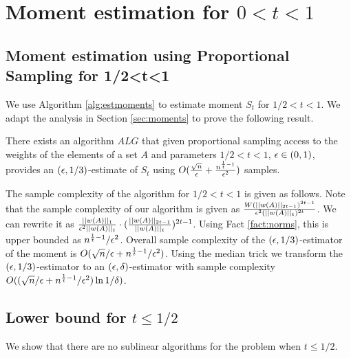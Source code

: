 \section{Moment estimation for $0<t<1$}\label{sec:small-t}

\subsection{Moment estimation using Proportional Sampling for 1/2<t<1} We use Algorithm \ref{alg:estmoments} to estimate moment $S_t$ for $1/2<t<1$. We adapt the analysis in Section \ref{sec:moments} to prove the following result.

\begin{thm} There exists an algorithm $ALG$ that given proportional sampling access to the weights of the elements of a set $A$ and parameters $1/2<t<1$, $\epsilon\in (0,1)$, provides an $(\epsilon,1/3)$-estimate of $S_t$ using $O(\frac{\sqrt{n}}{\epsilon}+\frac{n^{\frac{1}{t}-1}}{\epsilon^2})$ samples. \end{thm}

The sample complexity of the algorithm for $1/2<t<1$ is given as follows. Note that the sample complexity of our algorithm is given as $\frac{W (||w(A)||_{2t-1})^{2t-1}}{\epsilon^2 (||w(A)||_t)^{2t}}$. We can rewrite it as $\frac{||w(A)||_1}{\epsilon^2 ||w(A)||_t} \cdot (\frac{||w(A)||_{2t-1}}{||w(A)||_t})^{2t-1}$. Using Fact \ref{fact:norms}, this is upper bounded as $n^{\frac{1}{t}-1}/\epsilon^2$. Overall sample complexity of the $(\epsilon,1/3)$-estimator of the moment is $O(\sqrt{n}/\epsilon+ n^{\frac{1}{t}-1}/\epsilon^2)$. Using the median trick we transform the $(\epsilon,1/3)$-estimator to an $(\epsilon,\delta)$-estimator with sample complexity $O((\sqrt{n}/\epsilon+ n^{\frac{1}{t}-1}/\epsilon^2) \ln 1/\delta)$.


\subsection{Lower bound for $t\leq 1/2$} We show that there are no sublinear algorithms for the problem when $t\leq 1/2$.

